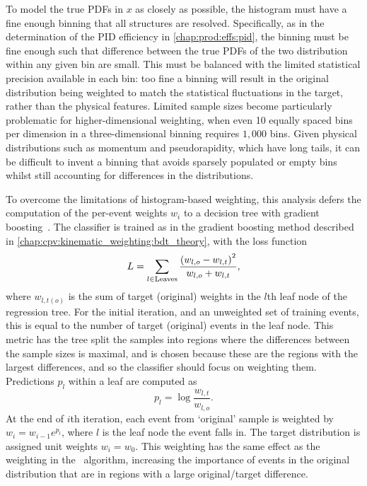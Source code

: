 To model the true \aclp{PDF} in $x$ as closely as possible, the histogram must 
have a fine enough binning that all structures are resolved.
Specifically, as in the determination of the \ac{PID} efficiency in 
\cref{chap:prod:effs:pid}, the binning must be fine enough such that difference 
between the true \acp{PDF} of the two distribution within any given bin are 
small.
This must be balanced with the limited statistical precision available in each 
bin: too fine a binning will result in the original distribution being weighted 
to match the statistical fluctuations in the target, rather than the physical 
features.
Limited sample sizes become particularly problematic for higher-dimensional 
weighting, when even 10 equally spaced bins per dimension in a 
three-dimensional binning requires $1,000$ bins.
Given physical distributions such as momentum and pseudorapidity, which have 
long tails, it can be difficult to invent a binning that avoids sparsely 
populated or empty bins whilst still accounting for differences in the 
distributions.

To overcome the limitations of histogram-based weighting, this analysis defers 
the computation of the per-event weights $w_{i}$ to a decision tree with 
gradient boosting~\cite{Rogozhnikov:2016bdp}.
The classifier is trained as in the gradient boosting method described in 
\cref{chap:cpv:kinematic_weighting:bdt_theory}, with the loss function
\begin{equation}
  L = \sum_{l \in \text{Leaves}} \frac{%
    {(w_{l,o} - w_{l,t})}^{2}
  }{%
    w_{l,o} + w_{l,t}
  },
\end{equation}
where $w_{l,t(o)}$ is the sum of target (original) weights in the $l$th leaf 
node of the regression tree.
For the initial iteration, and an unweighted set of training events, this is 
equal to the number of target (original) events in the leaf node.
This metric has the tree split the samples into regions where the differences 
between the sample sizes is maximal, and is chosen because these are the 
regions with the largest differences, and so the classifier should focus on 
weighting them.
Predictions $p_{l}$ within a leaf are computed as
\begin{equation}
  p_{l} = \log{\frac{w_{l,t}}{w_{l,o}}}.
\end{equation}
At the end of $i$th iteration, each event from `original' sample is weighted by 
$w_{i} = w_{i - 1}e^{p_{l}}$, where $l$ is the leaf node the event falls in.
The target distribution is assigned unit weights $w_{i} = w_{0}$.
This weighting has the same effect as the weighting in the \adaboost\ 
algorithm, increasing the importance of events in the original distribution 
that are in regions with a large original/target difference.


